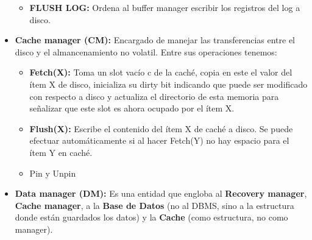 \begin{itemize}
\begin{itemize}
        \item \textbf{FLUSH LOG:} Ordena al buffer manager escribir los registros del log a disco.
    \end{itemize}
    \item \textbf{Cache manager (CM):} Encargado de manejar las transferencias entre el disco y el almancenamiento no volatil. Entre sus operaciones tenemos:
    \begin{itemize}
        \item \textbf{Fetch(X):} Toma un slot vacío c de la caché, copia en este el valor del ítem X de disco, inicializa su dirty bit indicando que puede ser modificado con respecto a disco y actualiza el directorio de esta memoria para señalizar que este slot es ahora ocupado por el ítem X.
        \item \textbf{Flush(X):} Escribe el contenido del ítem X de caché a disco. Se puede efectuar automáticamente si al hacer Fetch(Y) no hay espacio para el ítem Y en caché.
        \item Pin y Unpin
    \end{itemize}
    \item \textbf{Data manager (DM):} Es una entidad que engloba al \textbf{Recovery manager}, \textbf{Cache manager}, a la \textbf{Base de Datos} (no al DBMS, sino a la estructura donde están guardados los datos) y la \textbf{Cache} (como estructura, no como manager).
\end{itemize}
